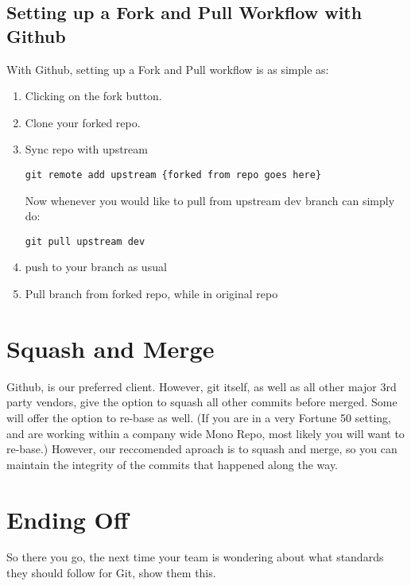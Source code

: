 \subsection { Setting up a Fork and Pull Workflow with Github }
With Github, setting up a Fork and Pull workflow is as simple as: 
\begin{enumerate}
  \item Clicking on the fork button.
  \item Clone your forked repo.
  \item Sync repo with upstream 
\begin{verbatim}
git remote add upstream {forked from repo goes here}
\end{verbatim}
Now whenever you would like to pull from upstream dev branch can simply do: 
\begin{verbatim}
git pull upstream dev   
\end{verbatim}
  \item push to your branch as usual
  \item Pull branch from forked repo, while in original repo 
\end{enumerate}

\section { Squash and Merge }
Github, is our preferred client. However, git itself, as well as all other major 3rd party vendors, give the option to squash all other commits before merged. Some will offer the option to re-base as well. (If you are in a very Fortune 50 setting, and are working within a company wide Mono Repo, most likely you will want to re-base.) However, our reccomended aproach is to squash and merge, so you can maintain the integrity of the commits that happened along the way. 

\section{Ending Off}
So there you go, the next time your team is wondering about what standards they should follow for Git, show them this. 
